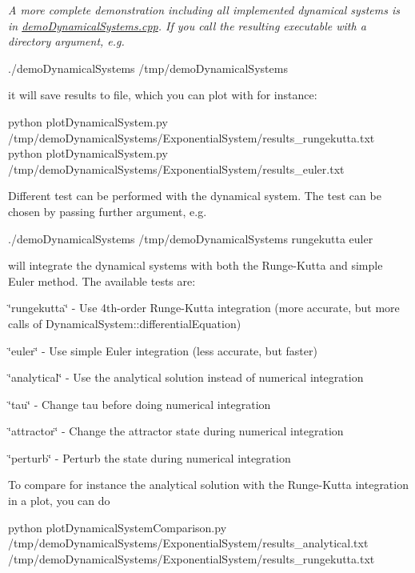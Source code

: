 {\itshape A more complete demonstration including all implemented dynamical systems is in \hyperlink{demoDynamicalSystems_8cpp}{demo\+Dynamical\+Systems.\+cpp}. If you call the resulting executable with a directory argument, e.\+g. 
\begin{DoxyCode}
./demoDynamicalSystems /tmp/demoDynamicalSystems
\end{DoxyCode}
 it will save results to file, which you can plot with for instance\+: 
\begin{DoxyCode}
python plotDynamicalSystem.py /tmp/demoDynamicalSystems/ExponentialSystem/results\_rungekutta.txt
python plotDynamicalSystem.py /tmp/demoDynamicalSystems/ExponentialSystem/results\_euler.txt
\end{DoxyCode}
 Different test can be performed with the dynamical system. The test can be chosen by passing further argument, e.\+g. 
\begin{DoxyCode}
./demoDynamicalSystems /tmp/demoDynamicalSystems rungekutta euler
\end{DoxyCode}
 will integrate the dynamical systems with both the Runge-\/\+Kutta and simple Euler method. The available tests are\+: \begin{DoxyItemize}
\item \char`\"{}rungekutta\char`\"{} -\/ Use 4th-\/order Runge-\/\+Kutta integration (more accurate, but more calls of Dynamical\+System\+::differential\+Equation) \item \char`\"{}euler\char`\"{} -\/ Use simple Euler integration (less accurate, but faster) \item \char`\"{}analytical\char`\"{} -\/ Use the analytical solution instead of numerical integration \item \char`\"{}tau\char`\"{} -\/ Change tau before doing numerical integration \item \char`\"{}attractor\char`\"{} -\/ Change the attractor state during numerical integration \item \char`\"{}perturb\char`\"{} -\/ Perturb the state during numerical integration\end{DoxyItemize}
To compare for instance the analytical solution with the Runge-\/\+Kutta integration in a plot, you can do 
\begin{DoxyCode}
python plotDynamicalSystemComparison.py /tmp/demoDynamicalSystems/ExponentialSystem/results\_analytical.txt 
       /tmp/demoDynamicalSystems/ExponentialSystem/results\_rungekutta.txt
\end{DoxyCode}
}

